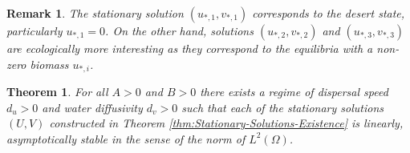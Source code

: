 \documentclass[12pt, a4paper]{article}
\theoremstyle{break}
\newtheorem{thm}{Theorem}[section]
\theoremstyle{break}
\theoremstyle{break}
\theoremstyle{break}
\newtheorem{rem}{Remark}[section]
\theoremstyle{break}
\theoremstyle{break}
\theoremstyle{break}
\begin{document}
\begin{rem}
    \label{rem:classification_steady_states}
    The stationary solution $(u_{*,1},v_{*,1})$ corresponds to the desert state, particularly $u_{*,1} = 0$. On the other hand, solutions $(u_{*,2},v_{*,2})$ and $(u_{*,3},v_{*,3})$ are ecologically more interesting as they correspond to the equilibria with a non-zero biomass $u_{*,i}$.
\end{rem}

\begin{thm}
    \label{thm:Stationary-Solutions-Stability}
    For all $A > 0$ and $B > 0$ there exists a regime of dispersal speed $d_u > 0$ and water diffusivity $d_v > 0$ such that each of the stationary solutions $(U, V)$ constructed in Theorem \ref{thm:Stationary-Solutions-Existence} is linearly, asymptotically stable in the sense of the norm of $L^2(\Omega)$.
\end{thm}
\end{document}
